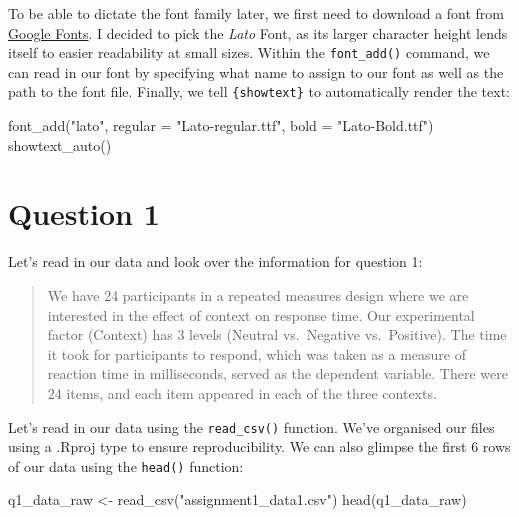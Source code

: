 \documentclass[
]{article}
\newenvironment{Shaded}{\begin{snugshade}}{\end{snugshade}}
\newcommand{\AttributeTok}[1]{\textcolor[rgb]{0.77,0.63,0.00}{#1}}
\newcommand{\FunctionTok}[1]{\textcolor[rgb]{0.00,0.00,0.00}{#1}}
\newcommand{\NormalTok}[1]{#1}
\newcommand{\OtherTok}[1]{\textcolor[rgb]{0.56,0.35,0.01}{#1}}
\newcommand{\StringTok}[1]{\textcolor[rgb]{0.31,0.60,0.02}{#1}}
\begin{document}
To be able to dictate the font family later, we first need to download a
font from \href{https://fonts.google.com/}{Google Fonts}. I decided to
pick the \emph{Lato} Font, as its larger character height lends itself
to easier readability at small sizes. Within the \texttt{font\_add()}
command, we can read in our font by specifying what name to assign to
our font as well as the path to the font file. Finally, we tell
\texttt{\{showtext\}} to automatically render the text:

\begin{Shaded}
\begin{Highlighting}[]
\FunctionTok{font\_add}\NormalTok{(}\StringTok{"lato"}\NormalTok{, }\AttributeTok{regular =} \StringTok{"Lato{-}regular.ttf"}\NormalTok{, }\AttributeTok{bold =} \StringTok{"Lato{-}Bold.ttf"}\NormalTok{)}
\FunctionTok{showtext\_auto}\NormalTok{()}
\end{Highlighting}
\end{Shaded}

\hypertarget{question-1}{%
\section{Question 1}\label{question-1}}

Let's read in our data and look over the information for question 1:

\begin{quote}
We have 24 participants in a repeated measures design where we are
interested in the effect of context on response time. Our experimental
factor (Context) has 3 levels (Neutral vs.~Negative vs.~Positive). The
time it took for participants to respond, which was taken as a measure
of reaction time in milliseconds, served as the dependent variable.
There were 24 items, and each item appeared in each of the three
contexts.
\end{quote}

Let's read in our data using the \texttt{read\_csv()} function. We've
organised our files using a .Rproj type to ensure reproducibility. We
can also glimpse the first 6 rows of our data using the \texttt{head()}
function:

\begin{Shaded}
\begin{Highlighting}[]
\NormalTok{q1\_data\_raw }\OtherTok{\textless{}{-}} \FunctionTok{read\_csv}\NormalTok{(}\StringTok{"assignment1\_data1.csv"}\NormalTok{)}
\FunctionTok{head}\NormalTok{(q1\_data\_raw)}
\end{Highlighting}
\end{Shaded}
\end{document}
